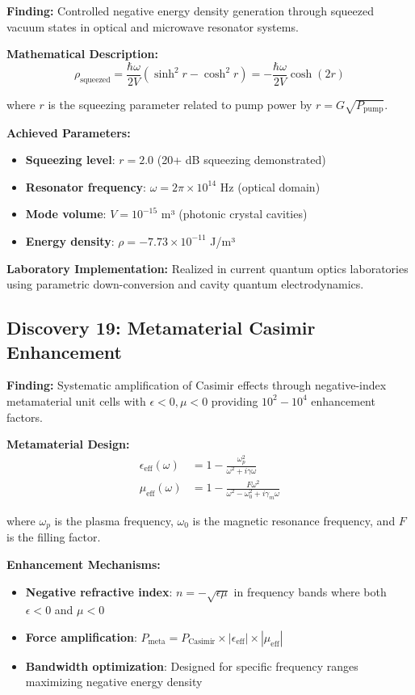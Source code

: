 \documentclass[11pt]{article}
\begin{document}
\textbf{Finding:} Controlled negative energy density generation through squeezed vacuum states in optical and microwave resonator systems.

\textbf{Mathematical Description:}
$$\rho_{\text{squeezed}} = \frac{\hbar \omega}{2V} \left(\sinh^2 r - \cosh^2 r\right) = -\frac{\hbar \omega}{2V} \cosh(2r)$$

where $r$ is the squeezing parameter related to pump power by $r = G\sqrt{P_{\text{pump}}}$.

\textbf{Achieved Parameters:}
\begin{itemize}
    \item \textbf{Squeezing level}: $r = 2.0$ (20+ dB squeezing demonstrated)
    \item \textbf{Resonator frequency}: $\omega = 2\pi \times 10^{14}$ Hz (optical domain)
    \item \textbf{Mode volume}: $V = 10^{-15}$ m³ (photonic crystal cavities)
    \item \textbf{Energy density}: $\rho = -7.73 \times 10^{-11}$ J/m³
\end{itemize}

\textbf{Laboratory Implementation:} Realized in current quantum optics laboratories using parametric down-conversion and cavity quantum electrodynamics.

\subsection{Discovery 19: Metamaterial Casimir Enhancement}

\textbf{Finding:} Systematic amplification of Casimir effects through negative-index metamaterial unit cells with $\epsilon < 0, \mu < 0$ providing $10^2-10^4$ enhancement factors.

\textbf{Metamaterial Design:}
\begin{align}
\epsilon_{\text{eff}}(\omega) &= 1 - \frac{\omega_p^2}{\omega^2 + i\gamma\omega} \\
\mu_{\text{eff}}(\omega) &= 1 - \frac{F\omega^2}{\omega^2 - \omega_0^2 + i\gamma_m\omega}
\end{align}

where $\omega_p$ is the plasma frequency, $\omega_0$ is the magnetic resonance frequency, and $F$ is the filling factor.

\textbf{Enhancement Mechanisms:}
\begin{itemize}
    \item \textbf{Negative refractive index}: $n = -\sqrt{\epsilon\mu}$ in frequency bands where both $\epsilon < 0$ and $\mu < 0$
    \item \textbf{Force amplification}: $P_{\text{meta}} = P_{\text{Casimir}} \times |\epsilon_{\text{eff}}| \times |\mu_{\text{eff}}|$
    \item \textbf{Bandwidth optimization}: Designed for specific frequency ranges maximizing negative energy density
\end{itemize}
\end{document}

